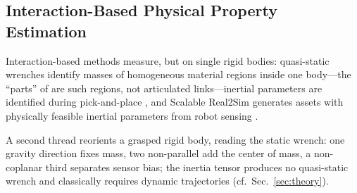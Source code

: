 \subsection{Interaction-Based Physical Property Estimation}

Interaction-based methods measure, but on single rigid bodies: quasi-static
wrenches identify masses of homogeneous material regions inside one
body---the ``parts'' of \cite{nadeau2023sum} are such regions, not articulated
links---inertial parameters are identified during pick-and-place
\cite{nadeau2022fast}, and Scalable Real2Sim generates
assets with physically feasible inertial parameters from robot sensing
\cite{pfaff2025scalable}.

A second thread reorients a grasped rigid body, reading the static wrench: one
gravity direction fixes mass, two non-parallel add the center of mass, a
non-coplanar third separates sensor bias; the inertia tensor
produces no quasi-static wrench and classically requires dynamic trajectories
\cite{atkeson1986estimation,kubus2008online} (cf.\ Sec.~\ref{sec:theory}).

